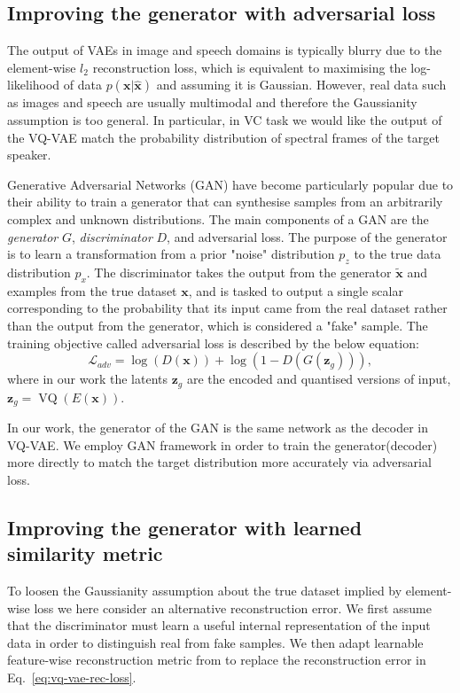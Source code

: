 \documentclass{article}
\DeclareMathOperator{\VQ}{VQ}
\begin{document}
\subsection{Improving the generator with adversarial loss}
The output of VAEs in image and speech domains is typically blurry due to the element-wise $l_2$ reconstruction loss, which is equivalent to maximising the log-likelihood of data $p(\mathbf{x}|\mathbf{\hat x})$ and assuming it is Gaussian. However, real data such as images and speech are usually multimodal and therefore the Gaussianity assumption is too general. In particular, in VC task we would like the output of the VQ-VAE match the probability distribution of spectral frames of the target speaker.

Generative Adversarial Networks (GAN) \cite{Goodfellow2014} have become particularly popular due to their ability to train a generator that can synthesise samples from an arbitrarily complex and unknown distributions. 
The main components of a GAN are the \textit{generator} $G$, \textit{discriminator} $D$, and adversarial loss. 
The purpose of the generator is to learn a transformation from a prior "noise" distribution $p_z$ to the true data distribution $p_x$. 
The discriminator takes the output from the generator $\mathbf{\tilde x}$ and examples from the true dataset $\mathbf{x}$, and is tasked to output a single scalar corresponding to the probability that its input came from the real dataset rather than the output from the generator, which is considered a "fake" sample. The training objective called adversarial loss is described by the below equation:
\begin{equation}
    \mathcal{L}_{adv} = \log(D(\mathbf{x})) + \log(1-D(G(\mathbf{z}_g))),
\end{equation}
where in our work the latents $\mathbf{z}_g$ are the encoded and quantised versions of input, $\mathbf{z}_g = \VQ(E(\mathbf{x}))$.

In our work, the generator of the GAN is the same network as the decoder in VQ-VAE.
We employ GAN framework in order to train the generator(decoder) more directly to match the target distribution more accurately via adversarial loss.


\subsection{Improving the generator with learned similarity metric}
To loosen the Gaussianity assumption about the true dataset implied by element-wise loss we here consider an alternative reconstruction error. We first assume that the discriminator must learn a useful internal representation of the input data in order to distinguish real from fake samples. We then adapt learnable feature-wise reconstruction metric from \citet{Larsen2015} to replace the reconstruction error in Eq.~\ref{eq:vq-vae-rec-loss}.
\end{document}
